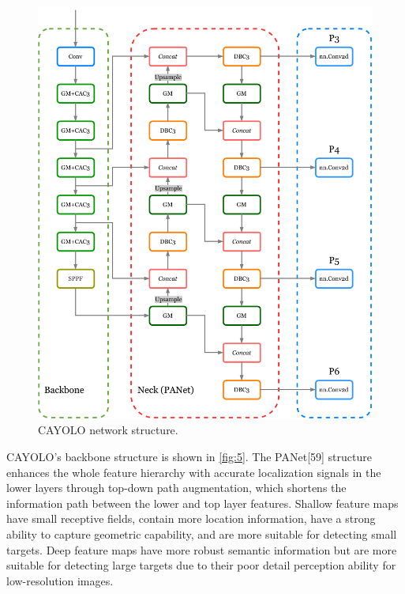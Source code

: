 \documentclass[sensors,article,submit,moreauthors]{Definitions/mdpi}
\begin{document}
    \begin{figure}[H]
        \includegraphics[width=\textwidth]{images/figure5}
        \caption{CAYOLO network structure.\label{fig:5}}
    \end{figure}


    CAYOLO's backbone structure is shown in \autoref{fig:5}. The PANet[59]\citep{liu_2018_CVPR} structure enhances the whole feature hierarchy with accurate localization signals in the lower layers through top-down path augmentation, which shortens the information path between the lower and top layer features. Shallow feature maps have small receptive fields, contain more location information, have a strong ability to capture geometric capability, and are more suitable for detecting small targets. Deep feature maps have more robust semantic information but are more suitable for detecting large targets due to their poor detail perception ability for low-resolution images.
\end{document}
